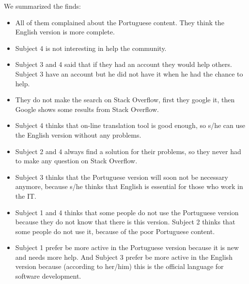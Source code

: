 




 We summarized the finds:

\begin{itemize}
	\item All of them complained about the Portuguese content. They think the English version is more complete.
	\item Subject 4 is not interesting in help the community.
	\item Subject 3 and 4 said that if they had an account they would help others. Subject 3 have an account but he did not have it when he had the chance to help.
	\item They do not make the search on Stack Overflow, first they google it, then Google shows some results from Stack Overflow.
	\item Subject 4 thinks that on-line translation tool is good enough, so s/he can use the English version without any problems.
	\item Subject 2 and 4 always find a solution for their problems, so they never had to make any question on Stack Overflow.
	\item Subject 3 thinks that the Portuguese version will soon not be necessary anymore, because s/he thinks that English is essential for those who work in the IT.
	\item Subject 1 and 4 thinks that some people do not use the Portuguese version because they do not know that there is this version. Subject 2 thinks that some people do not use it, because of the poor Portuguese content.
	\item Subject 1 prefer be more active in the Portuguese version because it is new and needs more help. And Subject 3 prefer be more active in the English version because (according to her/him) this is the official language for software development.
\end{itemize}
